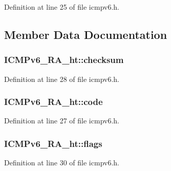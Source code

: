 Definition at line 25 of file icmpv6.\+h.



\subsection{Member Data Documentation}
\subsubsection[{\texorpdfstring{checksum}{checksum}}]{ I\+C\+M\+Pv6\+\_\+\+R\+A\+\_\+ht\+::checksum}\hypertarget{struct_i_c_m_pv6___r_a__ht_aa60666da952a52f10c215afc2c9dae6d}{}\label{struct_i_c_m_pv6___r_a__ht_aa60666da952a52f10c215afc2c9dae6d}


Definition at line 28 of file icmpv6.\+h.

\subsubsection[{\texorpdfstring{code}{code}}]{ I\+C\+M\+Pv6\+\_\+\+R\+A\+\_\+ht\+::code}\hypertarget{struct_i_c_m_pv6___r_a__ht_adcc6b0b601d32fc1b8e97356bcfff4f3}{}\label{struct_i_c_m_pv6___r_a__ht_adcc6b0b601d32fc1b8e97356bcfff4f3}


Definition at line 27 of file icmpv6.\+h.

\subsubsection[{\texorpdfstring{flags}{flags}}]{ I\+C\+M\+Pv6\+\_\+\+R\+A\+\_\+ht\+::flags}\hypertarget{struct_i_c_m_pv6___r_a__ht_abf0481d954644b89c6522dc1e486282b}{}\label{struct_i_c_m_pv6___r_a__ht_abf0481d954644b89c6522dc1e486282b}


Definition at line 30 of file icmpv6.\+h.

